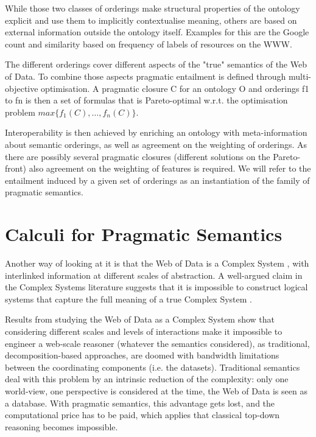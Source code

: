 \documentclass[letterpaper]{article}
\begin{document}
While those two classes of orderings make structural properties of the ontology explicit and use them to implicitly contextualise meaning, others are based on external information outside the ontology itself. Examples for this are the Google count and similarity \cite{cilibrasi} based on frequency of labels of resources on the WWW.

The different orderings cover different aspects of the "true" semantics of the Web of Data. To combine those aspects pragmatic entailment is defined through multi-objective optimisation. A pragmatic closure C for an ontology O and orderings f1 to fn is then a set of formulas that is Pareto-optimal \cite{pareto} w.r.t. the optimisation problem $max\{f_1(C),\ldots,f_n(C)\}$.

Interoperability is then achieved by enriching an ontology with meta-information about semantic orderings, as well as agreement on the weighting of orderings. As there are possibly several pragmatic closures (different solutions on the Pareto-front) also agreement on the weighting of features is required. We will refer to the entailment induced by a given set of orderings as an instantiation of the family of pragmatic semantics.

\section{Calculi for Pragmatic Semantics}

Another way of looking at it is that the Web of Data is a Complex System \cite{gueretACS2011}, with interlinked information at different scales of abstraction. A well-argued claim in the Complex Systems literature suggests that it is impossible to construct logical systems that capture the full meaning of a true Complex System \cite{bar-yam}.

Results from studying the Web of Data as a Complex System show that considering different scales and levels of interactions make it impossible to engineer a web-scale reasoner (whatever the semantics considered), as traditional, decomposition-based approaches, are doomed with bandwidth limitations between the coordinating components (i.e. the datasets). Traditional semantics deal with this problem by an intrinsic reduction of the complexity: only one world-view, one perspective is considered at the time, the Web of Data is seen as a database. With pragmatic semantics, this advantage gets lost, and the computational price has to be paid, which applies that classical top-down reasoning becomes impossible.
\end{document}

